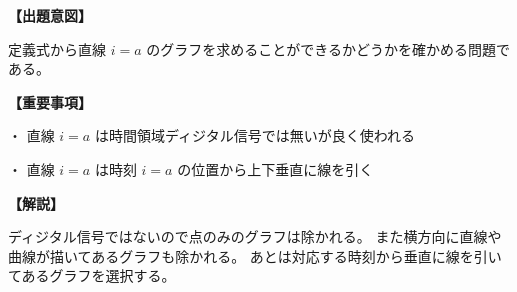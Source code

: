 \noindent \textbf{【出題意図】}

\noindent 定義式から直線 $i = a$ のグラフを求めることができるかどうかを確かめる問題である。

\vspace{1em}
\noindent \textbf{【重要事項】}

\bigskip
\noindent ・ 直線 $i = a$ は時間領域ディジタル信号では無いが良く使われる

\bigskip
\noindent ・ 直線 $i = a$ は時刻 $i=a$ の位置から上下垂直に線を引く


\vspace{1em}
\noindent \textbf{【解説】}

\noindent ディジタル信号ではないので点のみのグラフは除かれる。
また横方向に直線や曲線が描いてあるグラフも除かれる。
あとは対応する時刻から垂直に線を引いてあるグラフを選択する。

